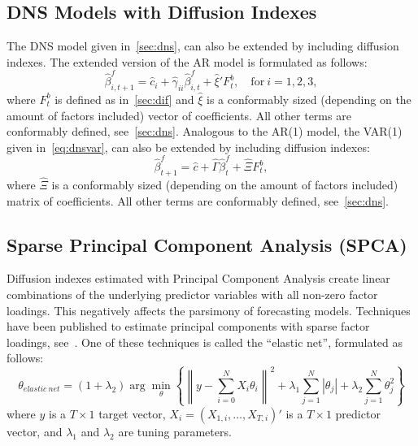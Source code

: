 \subsection{DNS Models with Diffusion Indexes}
\label{sec:dnsdif}
The DNS model given in~\cref{sec:dns}, can also be extended by including diffusion indexes. The extended version of the AR model is formulated as follows:
\begin{equation}
	\hat{\beta}_{i,t+1}^{f} = \hat{c}_i + \hat{\gamma}_{ii} \hat{\beta}_{i,t}^f + \hat{\xi}' F_t^b, \quad \text{for}~i = 1,2,3,
\end{equation}
where $F_t^b$ is defined as in~\cref{sec:dif} and $\hat{\xi}$ is a conformably sized (depending on the amount of factors included) vector of coefficients. 
All other terms are conformably defined, see~\cref{sec:dns}. 
Analogous to the AR(1) model, the VAR(1) given in~\cref{eq:dnsvar}, can also be extended by including diffusion indexes:
\begin{equation}
	\hat{\beta}_{t+1}^{f} = \hat{c} + \hat{\Gamma} \hat{\beta}_t^f + \hat{\Xi} F_t^b,
\end{equation}
where $\hat{\Xi}$ is a conformably sized (depending on the amount of factors included) matrix of coefficients. 
All other terms are conformably defined, see~\cref{sec:dns}.

\subsection{Sparse Principal Component Analysis (SPCA)}
\label{sec:spca}
Diffusion indexes estimated with Principal Component Analysis create linear combinations of the underlying predictor variables with all non-zero factor loadings. 
This negatively affects the parsimony of forecasting models. 
Techniques have been published to estimate principal components with sparse factor loadings, see~\textcite{Zou2006}. 
One of these techniques is called the \enquote{elastic net}, formulated as follows:
\begin{equation}
	\theta_{elastic\ net} = (1 + \lambda_2) \arg \underset{\theta}{\min} \left\{{\left\| y - \sum_{i=0}^{N} X_i \theta_i \right\|}^2 + \lambda_1 \sum_{j=1}^N \left|\theta_j\right| + \lambda_2 \sum_{j=1}^N \theta_j^2 \right\}
\end{equation}
where $y$ is a $T \times 1$ target vector, $X_i = \left(X_{1,i}, \dots, X_{T,i}\right)'$ is a $T \times 1$ predictor vector, and $\lambda_1$ and $\lambda_2$ are tuning parameters.

